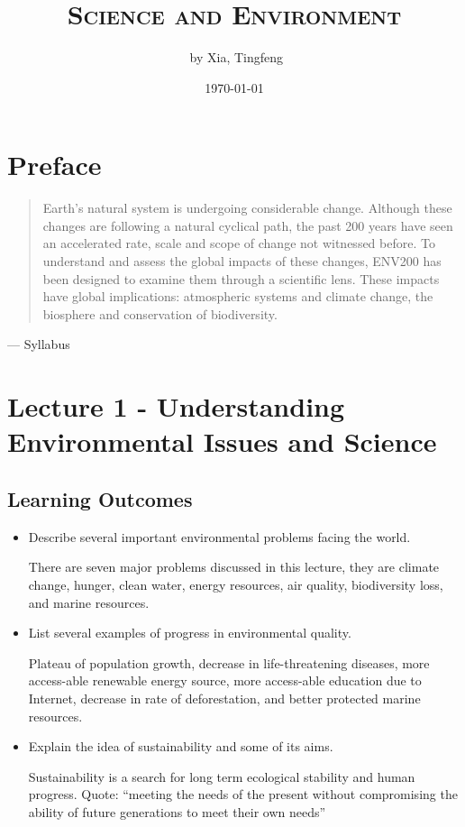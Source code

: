 \documentclass[10pt]{article}
\author{\ccLogo \,\,by Xia, Tingfeng}
\title{\textsc{Science and Environment}}
\date{\today}
\begin{document}
\maketitle
\doclicenseThis
\section*{Preface}
\begin{quote}
    Earth’s natural system is undergoing considerable change. Although these changes are following a  natural  cyclical  path, the  past  200  years  have  seen  an  accelerated rate,  scale  and  scope  of change not  witnessed  before.  To  understand  and  assess  the  global  impacts  of  these  changes, ENV200  has  been  designed  to examine  them through a  scientific lens. These impacts  have global implications: atmospheric systems and climate change, the biosphere and conservation of biodiversity.
\end{quote}
\hfill --- Syllabus

\tableofcontents
\newpage
\section{Lecture 1 - Understanding Environmental Issues and Science}
\subsection{Learning Outcomes}
\begin{itemize}
    \item Describe several important environmental problems facing the world.
    \begin{mdframed}
        There are seven major problems discussed in this lecture, they are climate change, hunger, clean water, energy resources, air quality, biodiversity loss, and marine resources. 
    \end{mdframed}
    \item List several examples of progress in environmental quality.
    \begin{mdframed}
        Plateau of population growth, decrease in life-threatening diseases, more access-able renewable energy source, more access-able education due to Internet, decrease in rate of deforestation, and better protected marine resources. 
    \end{mdframed}
    \item Explain the idea of sustainability and some of its aims.
    \begin{mdframed}
        Sustainability is a search for long term ecological stability and human progress. Quote: ``meeting the needs of the present without compromising the ability of future generations to meet their own needs''
    \end{mdframed}
\end{itemize}
\end{document}
